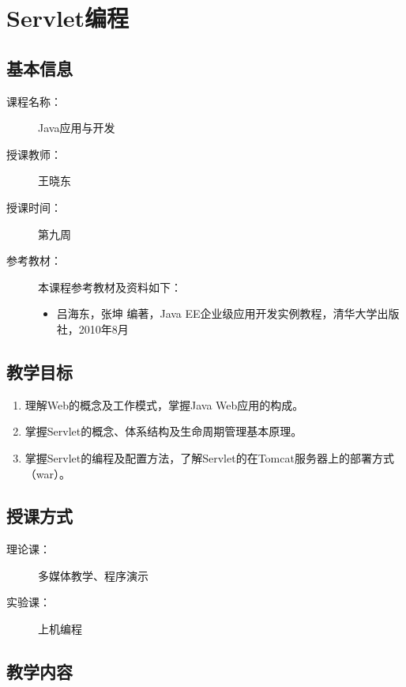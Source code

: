 \chapter*{ Servlet编程}
\label{chp:JavaEE-servlet-programming}

\section*{基本信息}
\sline
\begin{description}
\item[课程名称：] Java应用与开发
\item[授课教师：] 王晓东
\item[授课时间：] 第九周
\item[参考教材：] 本课程参考教材及资料如下：
  \begin{itemize}
  \item 吕海东，张坤 编著，Java EE企业级应用开发实例教程，清华大学出版社，2010年8月
  \end{itemize}
\end{description}

\section*{教学目标}

\sline

\begin{enumerate}
\item 理解Web的概念及工作模式，掌握Java Web应用的构成。
\item 掌握Servlet的概念、体系结构及生命周期管理基本原理。
\item 掌握Servlet的编程及配置方法，了解Servlet的在Tomcat服务器上的部署方式（war）。
\end{enumerate}  

\section*{授课方式}

\sline
\begin{description}
\item[理论课：] 多媒体教学、程序演示
\item[实验课：] 上机编程
\end{description}

\newpage
\section*{教学内容}
\sline

